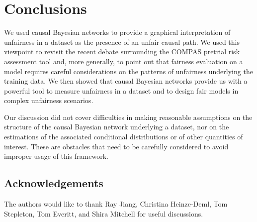 \documentclass[runningheads]{llncs}
\begin{document}
\section{Conclusions}
We used causal Bayesian networks to provide a graphical interpretation of unfairness in a dataset as the presence of an unfair causal path. 
We used this viewpoint to revisit the recent debate surrounding the COMPAS pretrial risk assessment tool and, more generally, to point out that fairness evaluation on a model requires careful considerations on the patterns of unfairness underlying the training data. We then showed that causal Bayesian networks provide us with a powerful tool to measure unfairness in a dataset and to design fair models in complex unfairness scenarios.

Our discussion did not cover difficulties in making reasonable assumptions on the structure of the causal Bayesian network underlying a dataset, nor on the estimations of the associated conditional distributions or of other quantities of interest. These are obstacles that need to be carefully considered to avoid improper usage of this framework.

\subsection*{Acknowledgements}
The authors would like to thank Ray Jiang, Christina Heinze-Deml, Tom Stepleton, Tom Everitt, and Shira Mitchell for useful discussions.
\end{document}

